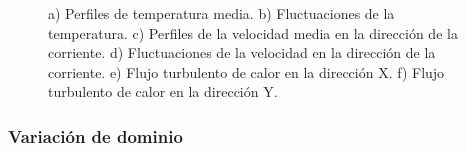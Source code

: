 \begin{figure}[H]
    
   \caption{a) Perfiles de temperatura media. b) Fluctuaciones de la temperatura. c) Perfiles de la velocidad media en la dirección de la corriente. d) Fluctuaciones de la velocidad en la dirección de la corriente. e) Flujo turbulento de calor en la dirección X. f) Flujo turbulento de calor en la dirección Y.} 
 
 \label{fig:guo}
\end{figure}


\subsubsection{Variación de dominio}

